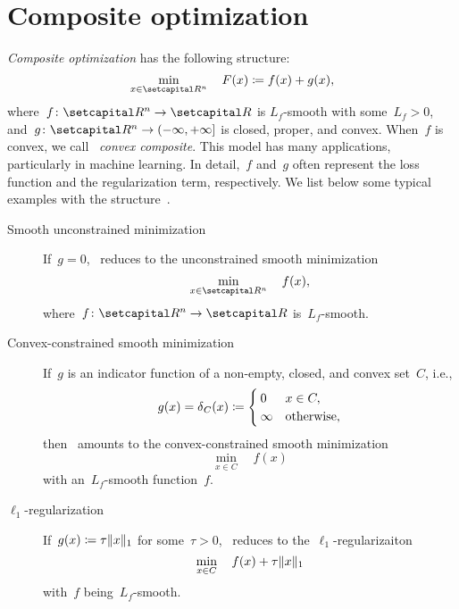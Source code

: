 \documentclass[../../main]{subfiles}
\begin{document}
\section{Composite optimization} 
\emph{Composite optimization} has the following structure:
\begin{equation} \label{eq:composite}
    \min_{x \in \setR^n} \quad F(x) \coloneqq f(x) + g(x)
,\end{equation} 
where~$f \colon \setR^n \to \setR$ is $L_f$-smooth with some~$L_f > 0$, and~$g \colon \setR^n \to (-\infty, +\infty]$ is closed, proper, and convex.
When~$f$ is convex, we call~ \emph{convex composite}.
This model has many applications, particularly in machine learning.
In detail,~$f$ and~$g$ often represent the loss function and the regularization term, respectively.
We list below some typical examples with the structure~.

\begin{example} 
    \begin{description}
        \item[Smooth unconstrained minimization] If~$g = 0$,~ reduces to the unconstrained smooth minimization
            \begin{equation}
                \min_{x \in \setR^n} \quad f(x)
            ,\end{equation} 
            where~$f \colon \setR^n \to \setR$ is~$L_f$-smooth.
        \item[Convex-constrained smooth minimization] If~$g$ is an indicator function of a non-empty, closed, and convex set~$C$, i.e.,
            \begin{equation} \label{eq:indicator}
                g(x) = \operatorname{\delta}_C(x) \coloneqq
                \begin{cases}
                    0 & x \in C, \\
                    \infty & \text{otherwise},
                \end{cases}
            \end{equation} 
            then~ amounts to the convex-constrained smooth minimization
            \begin{equation}
                \min_{x \in C} \quad f(x)
            \end{equation} 
            with an~$L_f$-smooth function~$f$.
        \item[$\ell_1$-regularization] If~$g(x) \coloneqq \tau \lVert x\rVert_1$ for some~$\tau > 0$,~ reduces to the~$\ell_1$-regularizaiton
            \begin{equation}
                \min_{x \in C} \quad f(x) + \tau \lVert x\rVert_1
            \end{equation} 
            with~$f$ being~$L_f$-smooth.
    \end{description}
\end{example}




\end{document}
